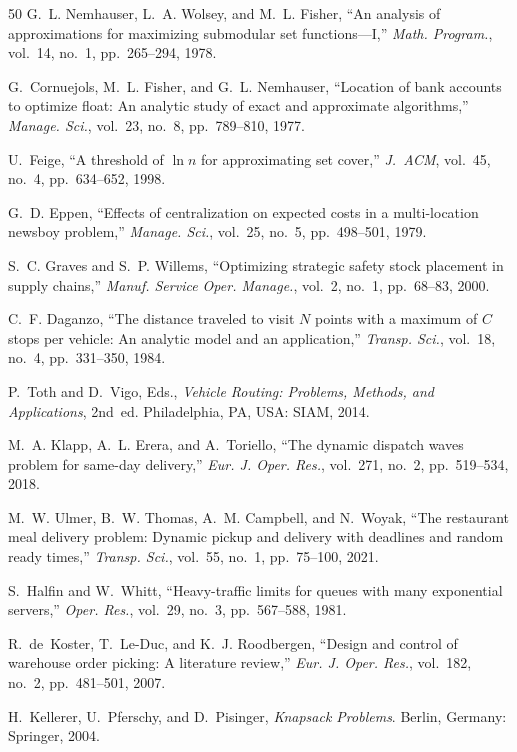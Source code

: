 \documentclass[journal]{IEEEtran}
\begin{document}
\begin{thebibliography}{50}
 G.~L. Nemhauser, L.~A. Wolsey, and M.~L. Fisher, ``An analysis of approximations for maximizing submodular set functions---I,'' \emph{Math. Program.}, vol.~14, no.~1, pp.~265--294, 1978.

 G.~Cornuejols, M.~L. Fisher, and G.~L. Nemhauser, ``Location of bank accounts to optimize float: An analytic study of exact and approximate algorithms,'' \emph{Manage. Sci.}, vol.~23, no.~8, pp.~789--810, 1977.

 U.~Feige, ``A threshold of $\ln n$ for approximating set cover,'' \emph{J.~ACM}, vol.~45, no.~4, pp.~634--652, 1998.

 G.~D. Eppen, ``Effects of centralization on expected costs in a multi-location newsboy problem,'' \emph{Manage. Sci.}, vol.~25, no.~5, pp.~498--501, 1979.

 S.~C. Graves and S.~P. Willems, ``Optimizing strategic safety stock placement in supply chains,'' \emph{Manuf. Service Oper. Manage.}, vol.~2, no.~1, pp.~68--83, 2000.

 C.~F. Daganzo, ``The distance traveled to visit $N$ points with a maximum of $C$ stops per vehicle: An analytic model and an application,'' \emph{Transp. Sci.}, vol.~18, no.~4, pp.~331--350, 1984.

 P.~Toth and D.~Vigo, Eds., \emph{Vehicle Routing: Problems, Methods, and Applications}, 2nd~ed. Philadelphia, PA, USA: SIAM, 2014.

 M.~A. Klapp, A.~L. Erera, and A.~Toriello, ``The dynamic dispatch waves problem for same-day delivery,'' \emph{Eur. J. Oper. Res.}, vol.~271, no.~2, pp.~519--534, 2018.

 M.~W. Ulmer, B.~W. Thomas, A.~M. Campbell, and N.~Woyak, ``The restaurant meal delivery problem: Dynamic pickup and delivery with deadlines and random ready times,'' \emph{Transp. Sci.}, vol.~55, no.~1, pp.~75--100, 2021.

 S.~Halfin and W.~Whitt, ``Heavy-traffic limits for queues with many exponential servers,'' \emph{Oper. Res.}, vol.~29, no.~3, pp.~567--588, 1981.

 R.~de~Koster, T.~Le-Duc, and K.~J. Roodbergen, ``Design and control of warehouse order picking: A literature review,'' \emph{Eur. J. Oper. Res.}, vol.~182, no.~2, pp.~481--501, 2007.

 H.~Kellerer, U.~Pferschy, and D.~Pisinger, \emph{Knapsack Problems}. Berlin, Germany: Springer, 2004.


\end{thebibliography}
\end{document}
